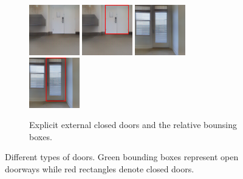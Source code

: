 \begin{figure}[h!]
	\begin{subfigure}[b]{\linewidth}
		\centering
		\includegraphics[width=0.24\textwidth]{images/explicitexternalclosed1.png}
		\hfill
		\includegraphics[width=0.24\textwidth]{images/explicitexternalclosed1boxed.png}
		\hfill
		\includegraphics[width=0.24\textwidth]{images/explicitexternalclosed2.png}
		\hfill
		\includegraphics[width=0.24\textwidth]{images/explicitexternalclosed2boxed.png}
		\caption{Explicit external closed doors and the relative bounsing boxes.}
	\end{subfigure}
	\caption{Different types of doors. Green bounding boxes represent open doorways while red rectangles denote closed doors.}
\end{figure}

